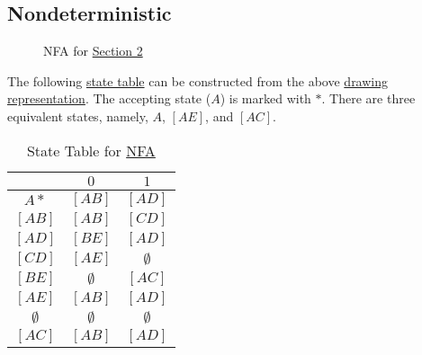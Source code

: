 \documentclass[11pt,letterpaper]{article}
\begin{document}
\subsection{Nondeterministic}
\begin{figure}[!ht]
\centering
{}
\caption{NFA for \hyperref[sec:s2]{Section 2}}
\label{fig:nfa}
\end{figure}
The following \hyperref[tab:nfa]{state table} can be constructed from the above \hyperref[fig:nfa]{drawing representation}. The accepting state ($A$) is marked with $*$. There are three equivalent states, namely, $A$, $[AE]$, and $[AC]$.
\begin{table}[!ht]
\centering
\begin{tabular}{c| c c}
     & $0$ & $1$  \\
    \hline
    $A*$ & $[AB]$ & $[AD]$ \\
    $[AB]$ & $[AB]$ & $[CD]$ \\
    $[AD]$ & $[BE]$ & $[AD]$ \\
    $[CD]$ & $[AE]$ & $\emptyset$ \\
    $[BE]$ & $\emptyset$ & $[AC]$ \\
    $[AE]$ & $[AB]$ & $[AD]$ \\
    $\emptyset$ & $\emptyset$ & $\emptyset$ \\
    $[AC]$ & $[AB]$ & $[AD]$
\end{tabular}
\caption{State Table for \hyperref[fig:nfa]{NFA}}
\label{tab:nfa}
\end{table}
\end{document}
